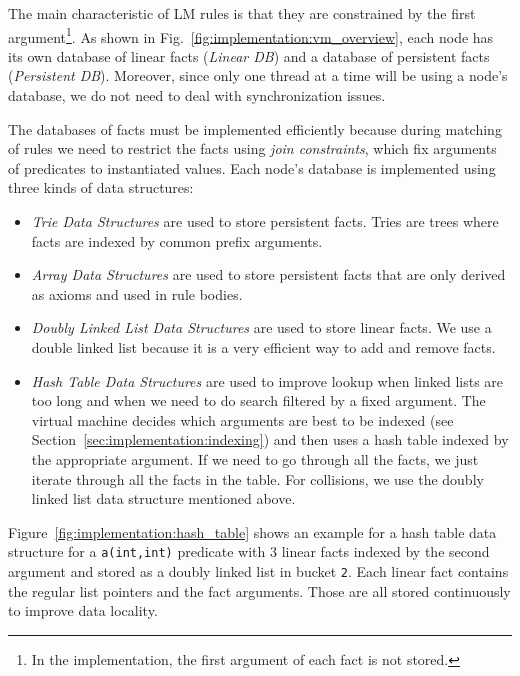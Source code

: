 The main characteristic of LM rules is that they are constrained by the first
argument\footnote{In the implementation, the first argument of each fact is not
   stored.}. As shown in Fig.~\ref{fig:implementation:vm_overview}, each node
has its own database of linear facts (\emph{Linear DB}) and a database of
persistent facts (\emph{Persistent DB}).  Moreover, since only one thread at a
time will be using a node's database, we do not need to deal with
synchronization issues.

The databases of facts must be implemented efficiently because during matching
of rules we need to restrict the facts using \emph{join constraints}, which fix
arguments of predicates to instantiated values. Each node's database is
implemented using three kinds of data structures:

\begin{itemize}

\item \emph{Trie Data Structures} are used to store persistent facts. Tries are
   trees where facts are indexed by common prefix arguments.

\item \emph{Array Data Structures} are used to store persistent facts that are
   only derived as axioms and used in rule bodies.

\item \emph{Doubly Linked List Data Structures} are used to store linear facts.
   We use a double linked list because it is a very efficient way to add and
   remove facts.

\item \emph{Hash Table Data Structures} are used to improve lookup when linked
   lists are too long and when we need to do search filtered by a fixed
   argument. The virtual machine decides which arguments are best to be indexed
   (see Section~\ref{sec:implementation:indexing}) and then uses a hash table
   indexed by the appropriate argument. If we need to go through all the facts,
   we just iterate through all the facts in the table. For collisions, we use
   the doubly linked list data structure mentioned above.

\end{itemize}

Figure~\ref{fig:implementation:hash_table} shows an example for a hash table
data structure for a \texttt{a(int,int)} predicate with 3 linear facts indexed
by the second argument and stored as a doubly linked list in bucket \texttt{2}.
Each linear fact contains the regular list pointers and the fact arguments.
Those are all stored continuously to improve data locality.


